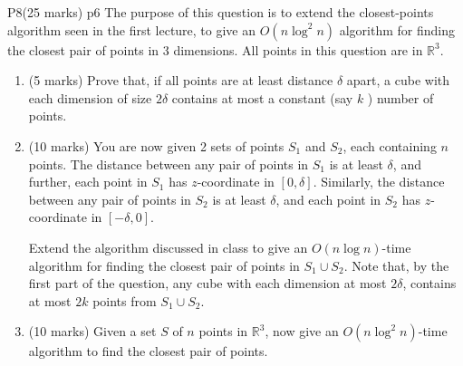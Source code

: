 \documentclass[a4paper, 11pt]{article}
\begin{document}
\begin{problem}{%
	P8\hfill  (25 marks)
}{p6%
}
The purpose of this question is to extend the closest-points algorithm seen in the first lecture, to give an $O\left(n \log ^2 n\right)$ algorithm for finding the closest pair of points in 3 dimensions. All points in this question are in $\mathbb{R}^3$.
\begin{enumerate}[label=(\alph*)]
	\item (5 marks) Prove that, if all points are at least distance $\delta$ apart, a cube with each dimension of size $2 \delta$ contains at most a constant (say $k$ ) number of points.
	\item (10 marks) You are now given 2 sets of points $S_1$ and $S_2$, each containing $n$ points. The distance between any pair of points in $S_1$ is at least $\delta$, and further, each point in $S_1$ has $z$-coordinate in $[0, \delta]$. Similarly, the distance between any pair of points in $S_2$ is at least $\delta$, and each point in $S_2$ has $z$-coordinate in $[-\delta, 0]$.
	
Extend the algorithm discussed in class to give an $O(n \log n)$-time algorithm for finding the closest pair of points in $S_1 \cup S_2$. Note that, by the first part of the question, any cube with each dimension at most $2 \delta$, contains at most $2 k$ points from $S_1 \cup S_2$.
\item  (10 marks) Given a set $S$ of $n$ points in $\mathbb{R}^3$, now give an $O\left(n \log ^2 n\right)$-time algorithm to find the closest pair of points.

\end{enumerate}

\end{problem}
\end{document}
